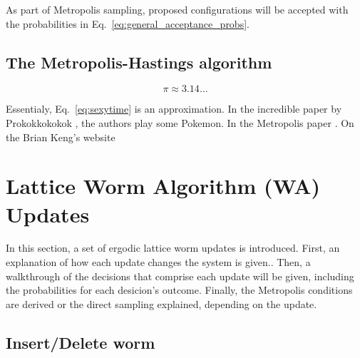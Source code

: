 \documentclass[12pt, two sided]{article}
\begin{document}
As part of Metropolis sampling, proposed configurations will be accepted with the probabilities in Eq.~\eqref{eq:general_acceptance_probs}.

\subsection{The Metropolis-Hastings algorithm}


\begin{equation}
\label{eq:sexytime}
\pi \approx 3.14\dots
\end{equation}

Essentialy, Eq.~\eqref{eq:sexytime} is an approximation. In the incredible paper by Prokokkokokok \cite{Prokof_ev_1998}, the authors play some Pokemon. In the Metropolis paper \cite{doi:10.1063/1.1699114}. On the Brian Keng's website \cite{bkeng.metropolis}

\section{Lattice Worm Algorithm (WA) Updates}

In this section, a set of ergodic lattice worm updates is introduced. First, an explanation of how each update changes the system is given.. Then, a walkthrough of the decisions that comprise each update will be given, including the probabilities for each desicion's outcome. Finally, the Metropolis conditions are derived or the direct sampling explained, depending on the update.

	\subsection{Insert/Delete worm}
        
\end{document}
